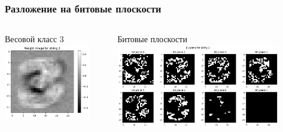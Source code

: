 \begin{frame}[t]
\frametitle{Разложение на битовые плоскости}
\begin{columns}
    \hspace{5mm}
    \begin{block}{Весовой класс 3}
        \vspace{3mm}
        \includegraphics[width = 0.85\textwidth]{pics/output1.png} 
    \end{block}
     
    \begin{block}{Битовые плоскости}
        \vspace{3mm}
        \includegraphics[width = 0.85\textwidth]{pics/output.png} 
    \end{block}
\end{columns}
\end{frame}

